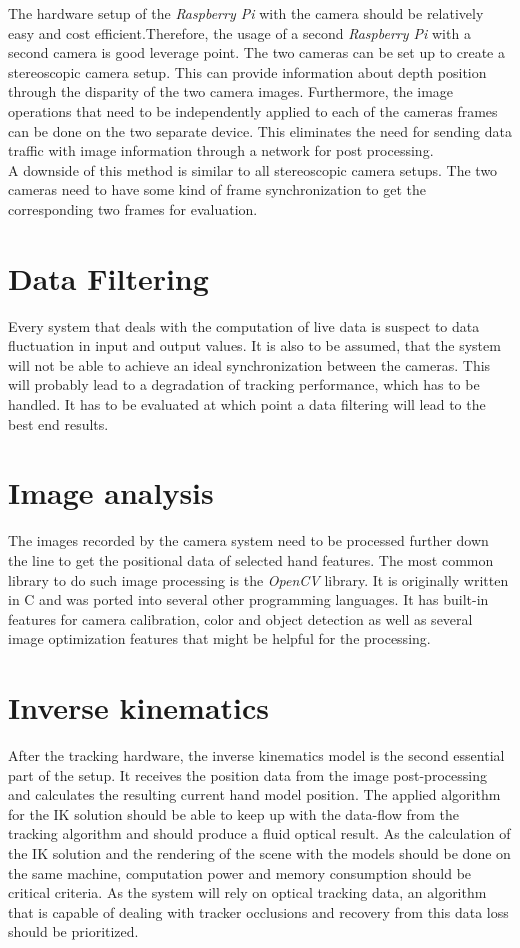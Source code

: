 The hardware setup of the \textit{Raspberry Pi} with the camera should be relatively easy and cost efficient.Therefore, the usage of a second \textit{Raspberry Pi} with a second camera is good leverage point. The two cameras can be set up to create a stereoscopic camera setup. This can provide information about depth position through the disparity of the two camera images. 
Furthermore, the image operations that need to be independently applied to each of the cameras frames can be done on the two separate device. This eliminates the need for sending data traffic with image information through a network for post processing.
\\A downside of this method is similar to all stereoscopic camera setups. The two cameras need to have some kind of frame synchronization to get the corresponding two frames for evaluation.
\section{Data Filtering}
Every system that deals with the computation of live data is suspect to data fluctuation in input and output values. It is also to be assumed, that the system will not be able to achieve an ideal synchronization between the cameras. This will probably lead to a degradation of tracking performance, which has to be handled. It has to be evaluated at which point a data filtering will lead to the best end results.
\section{Image analysis}
The images recorded by the camera system need to be processed further down the line to get the positional data of selected hand features. The most common library to do such image processing is the \textit{OpenCV} \cite{OpenCV.2018} library. It is originally written in C and was ported into several other programming languages. It has built-in features for camera calibration, color and object detection as well as several image optimization features that might be helpful for the processing.
\section{Inverse kinematics}
After the tracking hardware, the inverse kinematics model is the second essential part of the setup. It receives the position data from the image post-processing and calculates the resulting current hand model position. The applied algorithm for the IK solution should be able to keep up with the data-flow from the tracking algorithm and should produce a fluid optical result. As the calculation of the IK solution and the rendering of the scene with the models should be done on the same machine, computation power and memory consumption should be critical criteria. As the system will rely on optical tracking data, an algorithm that is capable of dealing with tracker occlusions and recovery from this data loss should be prioritized.
